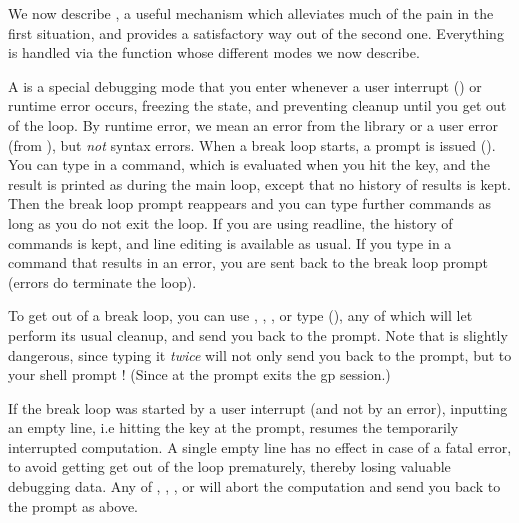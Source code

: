 We now describe , a useful mechanism which alleviates
much of the pain in the first situation, and provides a satisfactory way out
of the second one. Everything is handled via the  function whose
different modes we now describe.

\label{se:break_loop}

A  is a special debugging mode that you enter whenever a
user interrupt () or runtime error occurs, freezing the
 state, and preventing cleanup until you get out of the loop. By
runtime error, we mean an error from the library or a user error (from
), but \emph{not} syntax errors. When a break loop starts, a
prompt is issued (). You can type in a  command, which is
evaluated when you hit the  key, and the result is printed as
during the main  loop, except that no history of results is kept.
Then the break loop prompt reappears and you can type further commands as
long as you do not exit the loop. If you are using readline, the history of
commands is kept, and line editing is available as usual. If you type in a
command that results in an error, you are sent back to the break loop prompt
(errors do  terminate the loop).

To get out of a break loop, you can use , , ,
or type  (), any of which will let  perform its
usual cleanup, and send you back to the  prompt. Note that 
is slightly dangerous, since typing it \emph{twice} will not only send you
back to the  prompt, but to your shell prompt ! (Since  at
the  prompt exits the gp session.)

If the break loop was started by a user interrupt (and not by an error),
inputting an empty line, i.e hitting the  key at the 
prompt, resumes the temporarily interrupted computation. A single empty line
has no effect in case of a fatal error, to avoid getting get out of the loop
prematurely, thereby losing valuable debugging data. Any of ,
, , or  will abort the computation and send you
back to  the  prompt as above.

